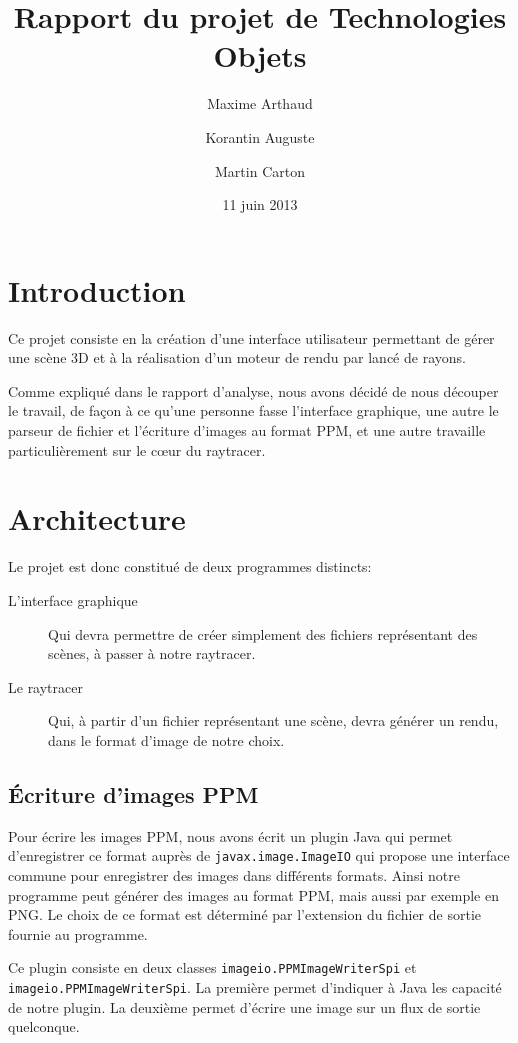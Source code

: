 \documentclass[a4paper]{article}
\title{Rapport du projet de Technologies Objets}
\author{Maxime Arthaud \and Korantin Auguste \and Martin Carton}
\date{11 juin 2013}
\begin{document}
\maketitle 
\tableofcontents
\listoffigures
\newpage

\section{Introduction}
  Ce projet consiste en la création d'une interface utilisateur permettant de
  gérer une scène 3D et à la réalisation d'un moteur de rendu par lancé de
  rayons.

  Comme expliqué dans le rapport d'analyse, nous avons décidé de nous découper
  le travail, de façon à ce qu'une personne fasse l'interface graphique,
  une autre le parseur de fichier et l'écriture d'images au format PPM, et une
  autre travaille particulièrement sur le cœur du raytracer.

\section{Architecture}
  Le projet est donc constitué de deux programmes distincts:
  \begin{description}
      \item[L'interface graphique] Qui devra permettre de créer simplement des
        fichiers représentant des scènes, à passer à notre raytracer.
      \item[Le raytracer] Qui, à partir d'un fichier représentant une scène,
        devra générer un rendu, dans le format d'image de notre choix.
  \end{description}

  \subsection{Écriture d'images PPM}
    Pour écrire les images PPM, nous avons écrit un plugin Java qui permet
    d'enregistrer ce format auprès de \verb+javax.image.ImageIO+ qui propose une
    interface commune pour enregistrer des images dans différents formats. Ainsi
    notre programme peut générer des images au format PPM, mais aussi par
    exemple en PNG. Le choix de ce format est déterminé par l'extension du
    fichier de sortie fournie au programme.

    Ce plugin consiste en deux classes \verb+imageio.PPMImageWriterSpi+ et
    \verb+imageio.PPMImageWriterSpi+. La première permet d'indiquer à Java les
    capacité de notre plugin. La deuxième permet d'écrire une image sur un flux
    de sortie quelconque.
\end{document}
